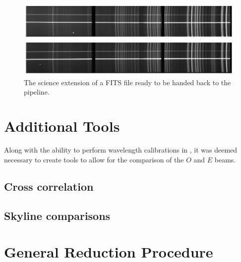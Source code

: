 \begin{figure}[t]
    \centering
    \includegraphics[width = 1.0\textwidth]{figures/3_post_wav_cal.pdf}
    \caption{The science extension of a \gls{FITS} file ready to be handed back to the \polsalt pipeline.}
    \label{fig:polsalt_post_wav_cal}
\end{figure}


\section{Additional Tools}\label{sec:add_tools}

Along with the ability to perform wavelength calibrations in \iraf, it was deemed necessary to create tools to allow for the comparison of the $O$ and $E$ beams.


\subsection{Cross correlation}



\subsection{Skyline comparisons}



\section{General Reduction Procedure}\label{sec:red_proc}

